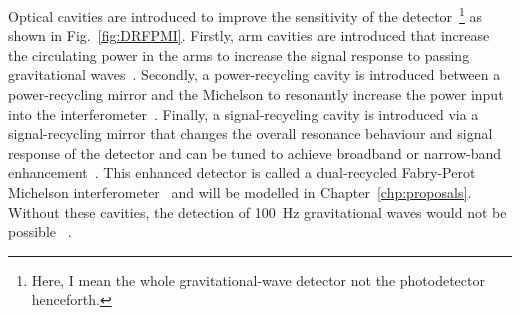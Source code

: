 Optical cavities are introduced to improve the sensitivity of the detector~\footnote{Here, I mean the whole gravitational-wave detector not the photodetector henceforth.} as shown in Fig.~\ref{fig:DRFPMI}. %
Firstly, arm cavities are introduced that increase the circulating power in the arms to increase the signal response to passing gravitational waves~\cite{}.
Secondly, a power-recycling cavity is introduced between a power-recycling mirror and the Michelson to resonantly increase the power input into the interferometer~\cite{meersRecyclingLaserinterferometricGravitationalwave1988,}.
Finally, a signal-recycling cavity is introduced via a signal-recycling mirror that changes the overall resonance behaviour and signal response of the detector and can be tuned to achieve broadband or narrow-band enhancement~\cite{meersRecyclingLaserinterferometricGravitationalwave1988,1995AuJPh..48..953M}.
This enhanced detector is called a dual-recycled Fabry-Perot Michelson interferometer~\cite{meersRecyclingLaserinterferometricGravitationalwave1988} and will be modelled in Chapter~\ref{chp:proposals}. Without these cavities, the detection of 100~Hz gravitational waves would not be possible~\cite{} . %

